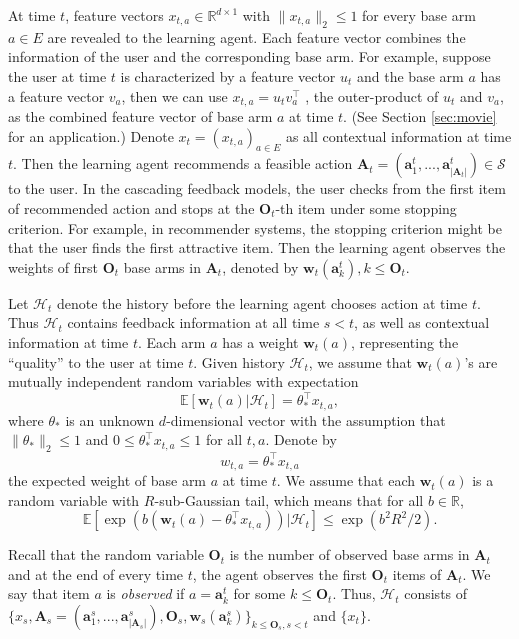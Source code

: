 \documentclass{article}
\newcommand{\EE}{\mathbb{E}}
\newcommand{\RR}{\mathbb{R}}
\newcommand{\bA}{\mathbf{A}}
\newcommand{\ba}{\mathbf{a}}
\newcommand{\bO}{\mathbf{O}}
\newcommand{\bw}{\mathbf{w}}
\newcommand{\cH}{\mathcal{H}}
\newcommand{\cS}{\mathcal{S}}
\newcommand{\abs}[1]{\left| #1 \right|}
\newcommand{\norm}[1]{\| #1 \|}
\begin{document}
At time $t$, feature vectors $x_{t,a} \in \RR^{d \times 1}$ with $\norm{x_{t,a}}_2 \leq 1$ for every base arm $a \in E$ are revealed to the learning agent. Each feature vector combines the information of the user and the corresponding base arm. For example, suppose the user at time $t$ is characterized by a feature vector $u_t$ and the base arm $a$ has a feature vector $v_a$, then we can use $x_{t,a} = u_t v_a^{\top}$ , the outer-product of $u_t$ and $v_a$, as the combined feature vector of base arm $a$ at time $t$. (See Section \ref{sec:movie} for an application.) Denote $x_t = (x_{t,a})_{a \in E}$ as all contextual information at time $t$. Then the learning agent recommends a feasible action $\bA_t=( \ba_{1}^t,...,\ba_{\abs{\bA_t}}^t ) \in \cS$ to the user. In the cascading feedback models, the user checks from the first item of recommended action and stops at the $\bO_t$-th item under some stopping criterion. For example, in recommender systems, the stopping criterion might be that the user finds the first attractive item. Then the learning agent observes the weights of first $\bO_t$ base arms in $\bA_t$, denoted by $\bw_t(\ba_k^t), k \leq \bO_t$. 

Let $\cH_t$ denote the history before the learning agent chooses action at time $t$. Thus $\cH_t$ contains feedback information at all time $s < t$, as well as contextual information at time $t$. Each arm $a$ has a weight $\bw_t(a)$, representing the ``quality'' to the user at time $t$. Given history $\cH_t$, we assume that $\bw_{t}(a)$'s are mutually independent random variables with expectation
\begin{equation} %
\label{eq:expectation}
\EE[\bw_{t}(a) | \cH_t] = \theta_{\ast}^{\top} x_{t,a},
\end{equation}
where $\theta_{\ast}$ is an unknown $d$-dimensional vector with the assumption that $\norm{\theta_{\ast}}_2 \leq 1$ and $0 \leq \theta_{\ast}^{\top} x_{t,a} \leq 1$ for all $t, a$. Denote by 
$$
w_{t,a} = \theta_{\ast}^{\top} x_{t,a}
$$
the expected weight of base arm $a$ at time $t$. We assume that each $\bw_{t}(a)$ is a random variable with $R$-sub-Gaussian tail, which means that for all $b \in \RR$, 
$$
\EE[\exp(b(\bw_{t}(a) - \theta_{\ast}^{\top} x_{t,a})) | \cH_t] \leq \exp(b^2 R^2 / 2).
$$

Recall that the random variable $\bO_t$ is the number of observed base arms in $\bA_t$ and at the end of every time $t$, the agent observes the first $\bO_t$ items of $\bA_t$. We say that item $a$ is {\it observed} if $a = \ba_k^t$ for some $k \leq \bO_t$. Thus, $\cH_t$ consists of $\{x_s, \bA_s = (\ba_{1}^s,...,\ba_{\abs{\bA_s}}^s), \bO_s, \bw_s(\ba_k^s) \}_{k\leq \bO_s, s < t}$ and $\{x_t\}$.
\end{document}
